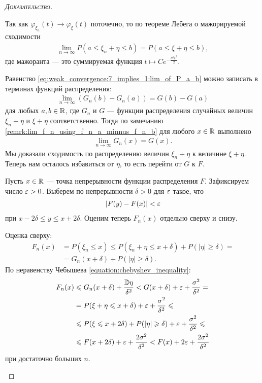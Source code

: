 \documentclass[../main.tex]{subfiles}
\begin{document}
\begin{proof}[\normalfont\textsc{Доказательство}]
\begin{itemize}
   Так как $ \varphi_{\xi_n}(t) \to \varphi_\xi(t) $ поточечно, то по теореме Лебега о мажорируемой сходимости 
   \begin{align}
    \label{eq:weak_convergence:7_implies_1:lim_of_P_a_b}
    \lim_{n \to \infty} P(a \leqslant \xi_n+\eta \leqslant b) = P(a \leqslant \xi+\eta \leqslant b),
   \end{align} где мажоранта --- это суммируемая функция $ t \mapsto C e^{-\frac{\sigma^{2}t^{2}}{2}} $.

   Равенство \eqref{eq:weak_convergence:7_implies_1:lim_of_P_a_b} можно записать в терминах функций распределения:
   \begin{align*}
    \lim_{n \to \infty} (G_n(b)-G_n(a)) = G(b)-G(a)
   \end{align*} для любых $ a,b \in \mathbb{R} $, где $ G_n $ и $ G $ --- функции распределения случайных величин $ \xi_n+\eta $ и $ \xi+\eta $ соответственно. Тогда по замечанию \ref{remrk:lim_f_n_using_f_n_a_minnus_f_n_b} для любого $ x \in \mathbb{R} $ выполнено
   \begin{align*}
    \lim_{n \to \infty} G_n(x)=G(x).
   \end{align*} Мы доказали сходимость по распределению величин $ \xi_n+\eta $ к величине $ \xi+\eta $. Теперь нам осталось избавиться от $ \eta $, то есть перейти от $ G $ к $ F $.

   Пусть $ x \in \mathbb{R} $ --- точка непрерывности функции распределения $ F $. Зафиксируем число $ \varepsilon > 0 $. Выберем по непрерывности $ \delta > 0 $ для $ \varepsilon $ такое, что
   \begin{align*}
    \left| F(y)-F(x) \right| < \varepsilon
   \end{align*} при $ x - 2\delta \leqslant y \leqslant x + 2\delta $. Оценим теперь $ F_n(x) $ отдельно сверху и снизу.

   Оценка сверху:
   \begin{align*}
    F_n(x)&=P(\xi_n \leqslant x) \leqslant P(\xi_n + \eta \leqslant x + \delta) + P(\left| \eta \right| \geqslant \delta) = \\
    &= G_n(x+\delta) + P(\left| \eta \right| \geqslant \delta).
   \end{align*} По неравенству Чебышева \eqref{equation:chebyshev_inequality}:
   \begin{align*}
    F_n(x) &\leqslant G_n(x + \delta) + \frac{\mathbb D\eta}{\delta^{2}} < G(x+\delta) + \varepsilon + \frac{\sigma^{2}}{\delta^{2}} = \\
    &= P(\xi+\eta \leqslant x + \delta) + \varepsilon + \frac{\sigma^{2}}{\delta^{2}} \leqslant \\
    &\leqslant P(\xi \leqslant x + 2\delta) + P(\left| \eta \right| \geqslant \delta) + \varepsilon + \frac{\sigma^{2}}{\delta^{2}} \leqslant \\
    &\leqslant F(x+2\delta) + \varepsilon +  \frac{2\sigma^{2}}{\delta^{2}} < F(x) + 2\varepsilon + \frac{2\sigma^{2}}{\delta^{2}}
   \end{align*} при достаточно больших $ n $.


\end{itemize}
\end{proof}
\end{document}
